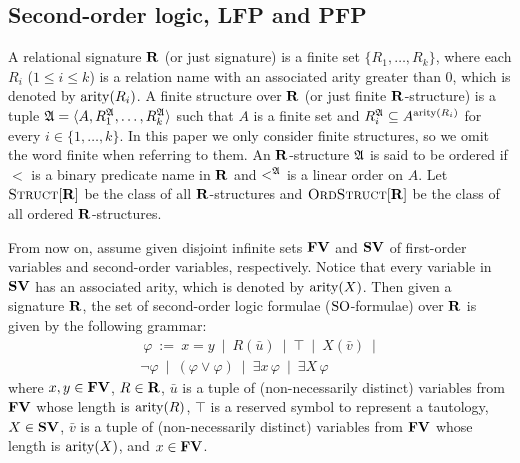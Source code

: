 

\subsection{Second-order logic, LFP and PFP}
A relational signature $\mathbf{R}$ (or just signature) is a finite set $\{R_1, \ldots, R_k\}$, where each $R_i$ ($1 \leq i \leq k$) is a relation name with an associated arity greater than 0, which is denoted by ${\rm arity}(R_i)$. A finite structure over $\mathbf{R}$ (or just finite $\mathbf{R}$-structure) is a tuple $\mathfrak{A} = \langle A, R_1^{\mathfrak{A}}, \ldots, R_k^{\mathfrak{A}} \rangle$ such that $A$ is a finite set and $R_i^{\mathfrak{A}} \subseteq A^{{\rm arity}(R_i)}$ for every $i \in \{1, \ldots, k\}$. In this paper we only consider finite structures, so we omit the word finite when referring to them. An $\mathbf{R}$-structure $\mathfrak{A}$ is said to be ordered if $<$ is a binary predicate name in $\mathbf{R}$ and $<^{\mathfrak{A}}$ is a linear order on $A$. Let $\text{\sc Struct}[\mathbf{R}]$ be the class of all $\mathbf{R}$-structures and $\text{\sc OrdStruct}[\mathbf{R}]$ be the class of all ordered $\mathbf{R}$-structures. 

From now on, assume given disjoint infinite sets $\mathbf{FV}$ and $\mathbf{SV}$ of first-order variables and second-order variables, respectively. Notice that every variable in $\mathbf{SV}$ has an associated arity, which is denoted by ${\rm arity}(X)$. Then given a  signature $\mathbf{R}$, the set of second-order logic formulae (${\rm SO}$-formulae) over $\mathbf{R}$ is given by the following grammar:
\begin{multline*}\ 
	\varphi \ := \ x = y \ \mid \ R(\bar u) \ \mid \ \top  \ \mid\  
	X(\bar v)  \ \mid\\ 
	\neg \varphi \ \mid\ 
	(\varphi \vee \varphi) \ \mid\ 
	\exists x \, \varphi \ \mid\ 
	\exists X \, \varphi
\end{multline*}
where $x,y \in \mathbf{FV}$, $R \in \mathbf{R}$, $\bar u$ is a tuple of (non-necessarily distinct) variables from $\mathbf{FV}$ whose length is ${\rm arity}(R)$, $\top$ is a reserved symbol to represent a tautology, $X \in \mathbf{SV}$, $\bar v$ is a tuple of (non-necessarily distinct) variables from $\mathbf{FV}$ whose length is ${\rm arity}(X)$, and $x \in \mathbf{FV}$. 



